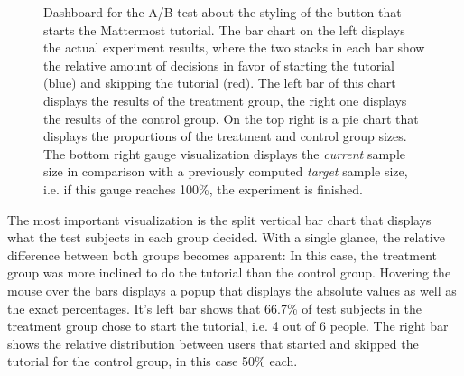 \begin{figure}[t]
        \caption[Dashboard for the A/B test about the styling of the button that starts the Mattermost tutorial.]{
        Dashboard for the A/B test about the styling of the button that starts the Mattermost tutorial.
        The bar chart on the left displays the actual experiment results, where the two stacks in each bar show the relative amount of decisions in favor of starting the tutorial (blue) and skipping the tutorial (red).
        The left bar of this chart displays the results of the treatment group, the right one displays the results of the control group.
        On the top right is a pie chart that displays the proportions of the treatment and control group sizes.
        The bottom right gauge visualization displays the \emph{current} sample size in comparison with a previously computed \emph{target} sample size, i.e. if this gauge reaches 100\%, the experiment is finished.}
        \label{figure:evaluation:user:dashboard-ab-test}
\end{figure}

The most important visualization is the split vertical bar chart that displays what the test subjects in each group decided.
With a single glance, the relative difference between both groups becomes apparent: In this case, the treatment group was more inclined to do the tutorial than the control group.
Hovering the mouse over the bars displays a popup that displays the absolute values as well as the exact percentages.
It's left bar shows that 66.7\% of test subjects in the treatment group chose to start the tutorial, i.e. 4 out of 6 people.
The right bar shows the relative distribution between users that started and skipped the tutorial for the control group, in this case 50\% each.

